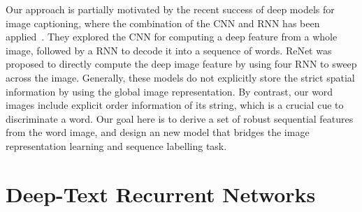 \documentclass[letterpaper]{article}
\begin{document}
Our approach is partially motivated by the recent success of deep models for image captioning, where the combination of the CNN and RNN has been applied~\cite{Andrej2015,Donahue2014,Alsharif2013}. They explored the CNN for computing a deep feature from a whole image, followed by a RNN to decode it into a sequence of words. ReNet \cite{Visin2015} was proposed to directly compute the deep image feature by using four RNN to sweep across the image. Generally, these models do not explicitly store the strict spatial information by using the global image representation. By contrast, our word images include explicit order information of its string, which is a crucial cue to discriminate a word.
Our goal here is to derive a set of robust sequential features from the word image, and design an new model that bridges the image representation learning and sequence labelling task.



\section{Deep-Text Recurrent Networks}

\end{document}
